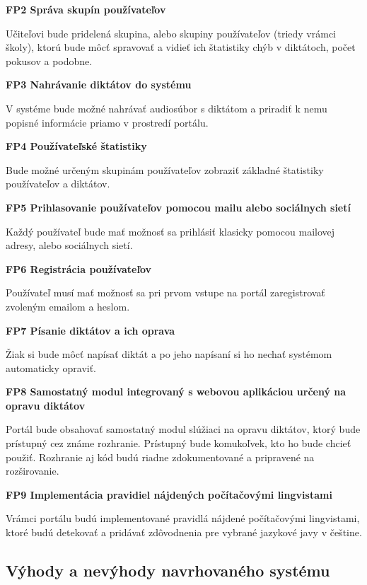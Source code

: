 \documentclass[12pt,oneside]{fithesis2}
\begin{document}
\bigskip
     \textbf{FP2 Správa skupín používateľov}  
     \par Učiteľovi bude pridelená skupina, alebo skupiny používateľov (triedy vrámci školy), ktorú bude môcť spravovať a vidieť ich štatistiky chýb v diktátoch, počet pokusov a podobne.
     
\bigskip
     \textbf{FP3 Nahrávanie diktátov do systému}  
     \par V systéme bude možné nahrávať audiosúbor s diktátom a priradiť k nemu popisné informácie priamo v prostredí portálu.     

\bigskip
     \textbf{FP4 Používateľské štatistiky}  
     \par Bude možné určeným skupinám používateľov zobraziť základné štatistiky používateľov a diktátov.
     
\bigskip
     \textbf{FP5 Prihlasovanie používateľov pomocou mailu alebo sociálnych sietí}  
	\par Každý používateľ bude mať možnosť sa prihlásiť klasicky pomocou mailovej adresy, alebo sociálnych sietí.
	
\bigskip
     \textbf{FP6 Registrácia používateľov}
     \par Používateľ musí mať možnosť sa pri prvom vstupe na portál zaregistrovať zvoleným emailom a heslom.
     
\bigskip
     \textbf{FP7 Písanie diktátov a ich oprava} 
     \par Žiak si bude môcť napísať diktát a po jeho napísaní si ho nechať systémom automaticky opraviť.
     
\bigskip
     \textbf{FP8 Samostatný modul integrovaný s webovou aplikáciou určený na opravu diktátov} 
     \par Portál bude obsahovať samostatný modul slúžiaci na opravu diktátov, ktorý bude prístupný cez známe rozhranie. Prístupný bude komukoľvek, kto ho bude chcieť použiť. Rozhranie aj kód budú riadne zdokumentované a pripravené na rozširovanie.         

\bigskip
     \textbf{FP9 Implementácia pravidiel nájdených počítačovými lingvistami}      		
	\par Vrámci portálu budú implementované pravidlá nájdené počítačovými lingvistami, ktoré budú detekovať a pridávať zdôvodnenia pre vybrané jazykové javy v češtine.

       		\subsection{Výhody a nevýhody navrhovaného systému}
       		
\end{document}
